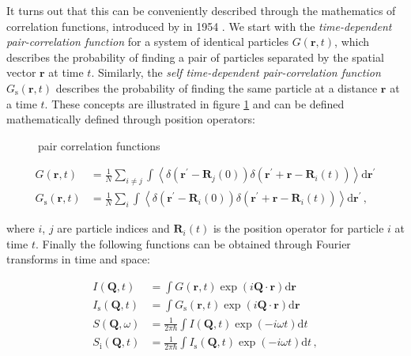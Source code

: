 It turns out that this can be conveniently described through the mathematics of correlation functions, introduced by \citeauthor{VanHove1954} in 1954 \cite{VanHove1954}. We start with the \emph{time-dependent pair-correlation function} for a system of identical particles $G(\bm{r}, t)$, which describes the probability of finding a pair of particles separated by the spatial vector $\bm{r}$ at time $t$. Similarly, the \emph{self time-dependent pair-correlation function} $G_\text{s}(\bm{r}, t)$ describes the probability of finding the same particle at a distance $\bm{r}$ at a time $t$. These concepts are illustrated in figure \ref{fig:correlation_functions} and can be defined mathematically defined through position operators:

\begin{figure}
	\centering
	\caption[pair correlation functions]{pair correlation functions}
	\label{fig:correlation_functions}
\end{figure}

\begin{align*}
	G(\bm{r}, t) &= \frac{1}{N} \sum_{i \neq j} \int \left\langle  \delta (\bm{r}^\prime - \bm{R}_j(0) ) \delta (\bm{r}^\prime + \bm{r} - \bm{R}_i(t)) \right\rangle \mathrm{d}\bm{r}^\prime \\
	G_\text{s}(\bm{r}, t) &= \frac{1}{N} \sum_{i} \int \left\langle  \delta (\bm{r}^\prime - \bm{R}_i(0) ) \delta (\bm{r}^\prime + \bm{r} - \bm{R}_i(t)) \right\rangle \mathrm{d}\bm{r}^\prime \, ,
\end{align*}

\noindent where $i$, $j$ are particle indices and $\bm{R}_i(t)$ is the position operator for particle $i$ at time $t$. Finally the following functions can be obtained through Fourier transforms in time and space:

\begin{align*}
	I(\bm{Q}, t) &= \int G(\bm{r},t) \exp (i \bm{Q} \cdot \bm{r} ) \mathrm{d}\bm{r} \\
	I_\text{s}(\bm{Q}, t) &= \int G_\text{s}(\bm{r},t) \exp (i \bm{Q} \cdot \bm{r} ) \mathrm{d}\bm{r} \\
	S(\bm{Q}, \omega) &= \frac{1}{2 \pi \hbar} \int I(\bm{Q}, t) \exp (-i \omega t) \mathrm{d}t \, \\
	S_\text{i}(\bm{Q}, t) &= \frac{1}{2 \pi \hbar} \int I_\text{s}(\bm{Q}, t) \exp (-i \omega t) \mathrm{d}t \, ,
\end{align*}

